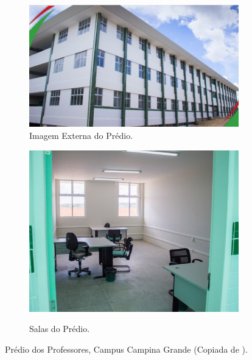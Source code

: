 \begin{figure}[H]
      \centering
      \begin{subfigure}{.5\textwidth}
            \centering
            \includegraphics[width=\textwidth]{./sections/textual/chapters/images/ifpb_predio.jpg}
            \caption{Imagem Externa do Prédio.}
            \label{fig:predioExt}
      \end{subfigure}
      \begin{subfigure}{.4\textwidth}
            \centering
            \includegraphics[width=\textwidth]{./sections/textual/chapters/images/ifpb_sala.jpg}\\
            \caption{Salas do Prédio.}
            \label{fig:ifpbSala}
      \end{subfigure}
      \caption{Prédio dos Professores, Campus Campina Grande (Copiada de \cite{figIFPB}).}
      \label{fig:campuscg}
\end{figure}

